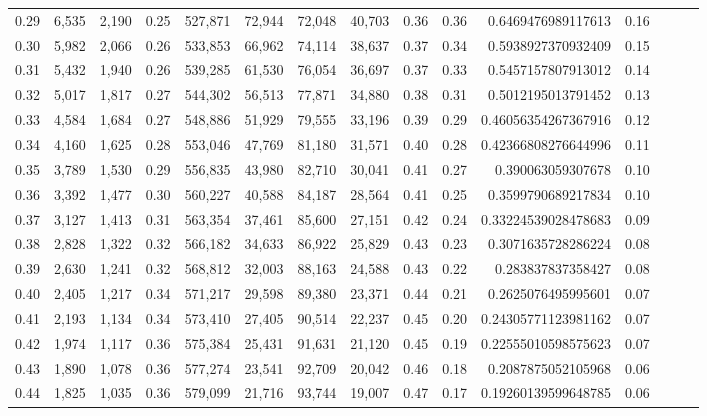 \begin{tabular}{rrrrrrrrrrrrrrr}
0.29 &   6,535 &  2,190 &  0.25 &  527,871 &   72,944 &   72,048 &   40,703 &  0.36 &  0.36 &      0.6469476989117613 &      0.16 \\
0.30 &   5,982 &  2,066 &  0.26 &  533,853 &   66,962 &   74,114 &   38,637 &  0.37 &  0.34 &      0.5938927370932409 &      0.15 \\
0.31 &   5,432 &  1,940 &  0.26 &  539,285 &   61,530 &   76,054 &   36,697 &  0.37 &  0.33 &      0.5457157807913012 &      0.14 \\
0.32 &   5,017 &  1,817 &  0.27 &  544,302 &   56,513 &   77,871 &   34,880 &  0.38 &  0.31 &      0.5012195013791452 &      0.13 \\
0.33 &   4,584 &  1,684 &  0.27 &  548,886 &   51,929 &   79,555 &   33,196 &  0.39 &  0.29 &     0.46056354267367916 &      0.12 \\
0.34 &   4,160 &  1,625 &  0.28 &  553,046 &   47,769 &   81,180 &   31,571 &  0.40 &  0.28 &     0.42366808276644996 &      0.11 \\
0.35 &   3,789 &  1,530 &  0.29 &  556,835 &   43,980 &   82,710 &   30,041 &  0.41 &  0.27 &       0.390063059307678 &      0.10 \\
0.36 &   3,392 &  1,477 &  0.30 &  560,227 &   40,588 &   84,187 &   28,564 &  0.41 &  0.25 &      0.3599790689217834 &      0.10 \\
0.37 &   3,127 &  1,413 &  0.31 &  563,354 &   37,461 &   85,600 &   27,151 &  0.42 &  0.24 &     0.33224539028478683 &      0.09 \\
0.38 &   2,828 &  1,322 &  0.32 &  566,182 &   34,633 &   86,922 &   25,829 &  0.43 &  0.23 &      0.3071635728286224 &      0.08 \\
0.39 &   2,630 &  1,241 &  0.32 &  568,812 &   32,003 &   88,163 &   24,588 &  0.43 &  0.22 &       0.283837837358427 &      0.08 \\
0.40 &   2,405 &  1,217 &  0.34 &  571,217 &   29,598 &   89,380 &   23,371 &  0.44 &  0.21 &      0.2625076495995601 &      0.07 \\
0.41 &   2,193 &  1,134 &  0.34 &  573,410 &   27,405 &   90,514 &   22,237 &  0.45 &  0.20 &     0.24305771123981162 &      0.07 \\
0.42 &   1,974 &  1,117 &  0.36 &  575,384 &   25,431 &   91,631 &   21,120 &  0.45 &  0.19 &     0.22555010598575623 &      0.07 \\
0.43 &   1,890 &  1,078 &  0.36 &  577,274 &   23,541 &   92,709 &   20,042 &  0.46 &  0.18 &      0.2087875052105968 &      0.06 \\
0.44 &   1,825 &  1,035 &  0.36 &  579,099 &   21,716 &   93,744 &   19,007 &  0.47 &  0.17 &     0.19260139599648785 &      0.06 \\

\end{tabular}
